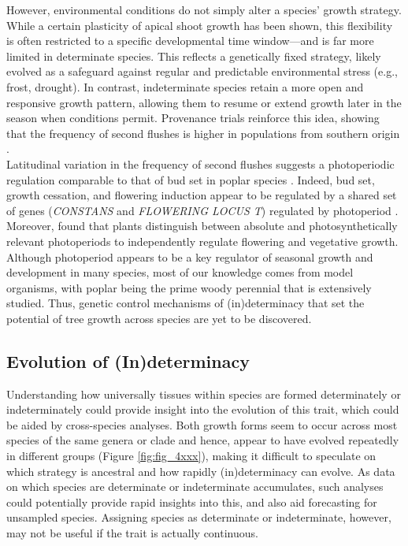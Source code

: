 \documentclass{article}
\begin{document}
	However, environmental conditions do not simply alter a species' growth strategy. While a certain plasticity of apical shoot growth has been shown, this flexibility is often restricted to a specific developmental time window—and is far more limited in determinate species. This reflects a genetically fixed strategy, likely evolved as a safeguard against regular and predictable environmental stress (e.g., frost, drought). In contrast, indeterminate species retain a more open and responsive growth pattern, allowing them to resume or extend growth later in the season when conditions permit. Provenance trials reinforce this idea, showing that the frequency of second flushes is higher in populations from southern origin \citep{rudolphLammasGrowthProlepsis1964, soolanayakanahallyTimingPhotoperiodicCompetency2013a}.\\
	
	Latitudinal variation in the frequency of second flushes suggests a photoperiodic regulation comparable to that of bud set in poplar species  \citep{soolanayakanahallyTimingPhotoperiodicCompetency2013a}. Indeed, bud set, growth cessation, and flowering induction appear to be regulated by a shared set of genes (\textit{CONSTANS} and \textit{FLOWERING LOCUS T}) regulated by photoperiod \citep{bohleniusCOFTRegulatory2006a}. Moreover, \citet{wangPlantsDistinguishDifferent2024b} found that plants distinguish between absolute and photosynthetically relevant photoperiods to independently regulate flowering and vegetative growth.  \\
	
	Although photoperiod appears to be a key regulator of seasonal growth and development in many species, most of our knowledge comes from model organisms, with poplar being the prime woody perennial that is extensively studied. Thus, genetic control mechanisms of (in)determinacy that set the potential of tree growth across species are yet to be discovered. \\
	
	
										
	\subsection*{Evolution of (In)determinacy}
	Understanding how universally tissues within species are formed determinately or indeterminately could provide insight into the evolution of this trait, which could be aided by cross-species analyses. Both growth forms seem to occur across most species of the same genera or clade and hence, appear to have evolved repeatedly in different groups (Figure \ref{fig:fig_4xxx}), making it difficult to speculate on which strategy is ancestral \citep[but see][]{hariharanIndeterminateGrowthCould2016} and how rapidly (in)determinacy can evolve. As data on which species are determinate or indeterminate accumulates, such analyses could potentially provide rapid insights into this, and also aid forecasting for unsampled species. Assigning species as determinate or indeterminate, however, may not be useful if the trait is actually continuous. \\
\end{document}
